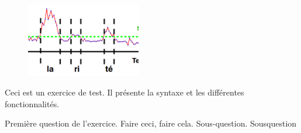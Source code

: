 

\begin{figure}
    \centering
    \includegraphics[width=5cm]{images/1.png}
\end{figure}

Ceci est un exercice de test. Il présente la syntaxe et les différentes fonctionnalités.

\question Première question de l'exercice. Faire ceci, faire cela.
\subquestion Sous-question.
\question \subquestion Sousquestion


